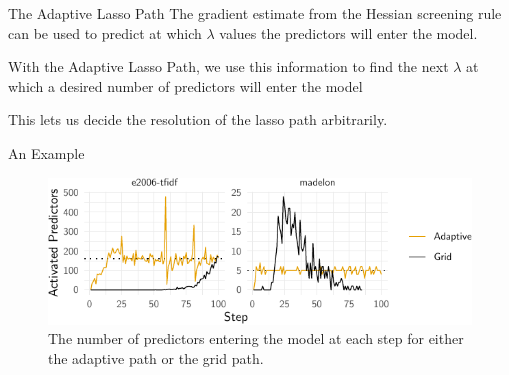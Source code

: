 \documentclass[10pt,ignorenonframetext]{beamer}
\begin{document}
\begin{frame}{The Adaptive Lasso Path}
  The gradient estimate from the Hessian screening rule can be used to predict
  at which \(\lambda\) values the predictors will enter the model. \medskip

  With the Adaptive Lasso Path, we use this information to find the next
  \(\lambda\) at which a desired number of predictors will enter the model
  \medskip

  This lets us decide the resolution of the lasso path arbitrarily.
\end{frame}

\begin{frame}{An Example}
  \begin{figure}
    \includegraphics{figures/case-study.pdf}
    \caption{The number of predictors entering the model at each step for
      either
      the adaptive path or the grid path.}
  \end{figure}
\end{frame}
\end{document}
